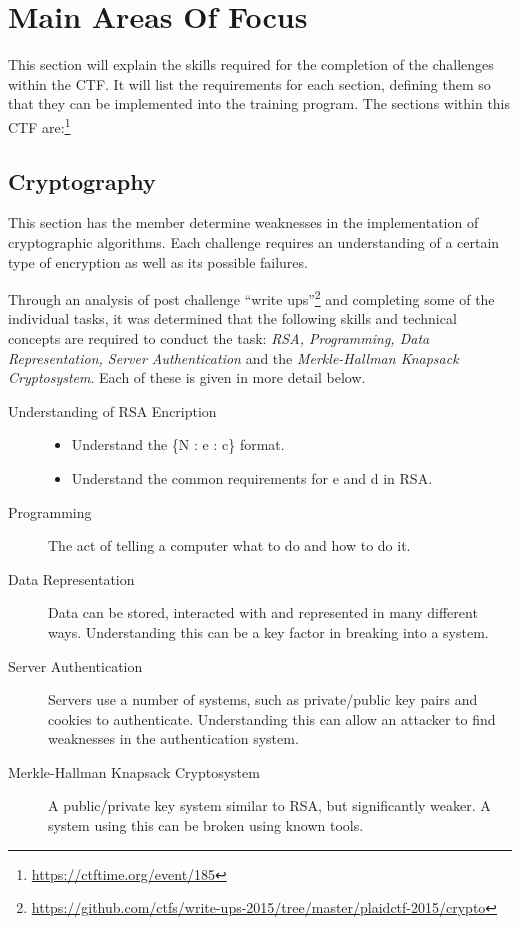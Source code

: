 \documentclass[a4paper,11pt]{report}
\begin{document}
	\section{Main Areas Of Focus}
		This section will explain the skills required for the completion of the challenges within the CTF. 
		It will list the requirements for each section, defining them so that they can be implemented into the training program. 
		The sections within this CTF are:\footnote{\url{https://ctftime.org/event/185}}
		\subsection{Cryptography}
			This section has the member determine weaknesses in the implementation of cryptographic algorithms. 
			Each challenge requires an understanding of a certain type of encryption as well as its possible failures. 


			Through an analysis of post challenge ``write ups''\footnote{\url{https://github.com/ctfs/write-ups-2015/tree/master/plaidctf-2015/crypto}}
			and completing some of the individual tasks, 
			it was determined that the following skills and technical concepts are required to conduct the task: 
			\textit{RSA, Programming, Data Representation, Server Authentication} and the \textit{Merkle-Hallman Knapsack Cryptosystem}. 
			Each of these is given in more detail below. 
			\begin{description}
				\item[Understanding of RSA Encription]
				\begin{itemize}
					\item Understand the \{N : e : c\} format. 
					\item Understand the common requirements for e and d in RSA. 
				\end{itemize}
				\item[Programming] 
					The act of telling a computer what to do and how to do it. 
				\item[Data Representation] 
					Data can be stored, interacted with and represented in many different ways. 
					Understanding this can be a key factor in breaking into a system. 
				\item[Server Authentication]
					Servers use a number of systems, such as private/public key pairs and cookies to authenticate. 
					Understanding this can allow an attacker to find weaknesses in the authentication system. 
				\item[Merkle-Hallman Knapsack Cryptosystem]
					A public/private key system similar to RSA, but significantly weaker. 
					A system using this can be broken using known tools. 
			\end{description}
\end{document}
